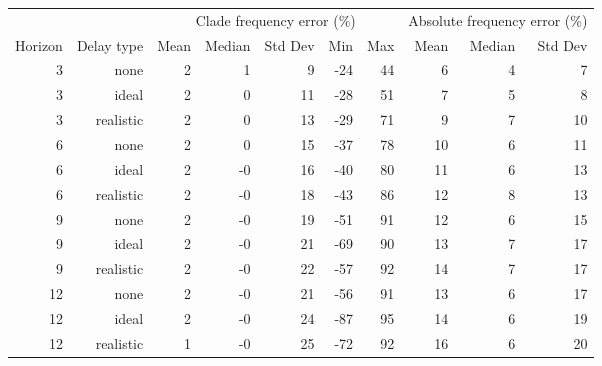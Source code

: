 
\begin{tabular*}{1.0\textwidth}{rrrrrrrrrr}
\toprule
        &            & \multicolumn{5}{c}{Clade frequency error (\%)} & \multicolumn{3}{c}{Absolute frequency error (\%)} \\
Horizon & Delay type & Mean & Median & Std Dev & Min & Max & Mean & Median & Std Dev \\
\midrule

3 & none & 2 & 1 & 9 & -24 & 44 & 6 & 4 & 7 \\
3 & ideal & 2 & 0 & 11 & -28 & 51 & 7 & 5 & 8 \\
3 & realistic & 2 & 0 & 13 & -29 & 71 & 9 & 7 & 10 \\
6 & none & 2 & 0 & 15 & -37 & 78 & 10 & 6 & 11 \\
6 & ideal & 2 & -0 & 16 & -40 & 80 & 11 & 6 & 13 \\
6 & realistic & 2 & -0 & 18 & -43 & 86 & 12 & 8 & 13 \\
9 & none & 2 & -0 & 19 & -51 & 91 & 12 & 6 & 15 \\
9 & ideal & 2 & -0 & 21 & -69 & 90 & 13 & 7 & 17 \\
9 & realistic & 2 & -0 & 22 & -57 & 92 & 14 & 7 & 17 \\
12 & none & 2 & -0 & 21 & -56 & 91 & 13 & 6 & 17 \\
12 & ideal & 2 & -0 & 24 & -87 & 95 & 14 & 6 & 19 \\
12 & realistic & 1 & -0 & 25 & -72 & 92 & 16 & 6 & 20 \\

\bottomrule
\end{tabular*}


